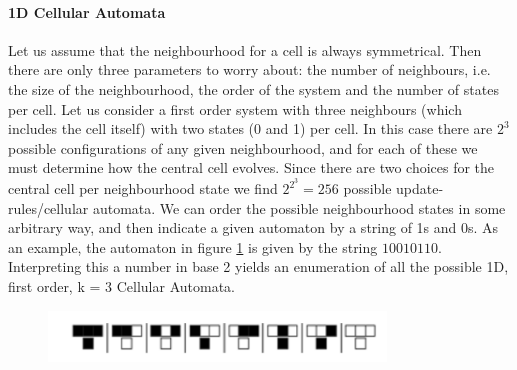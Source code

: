 \documentclass[12pt]{article}
\numberwithin{equation}{section}
\begin{document}
\paragraph{1D Cellular Automata}
Let us assume that the neighbourhood for a cell is always symmetrical. Then there are only three parameters to worry about: the number of neighbours, i.e. the size of the neighbourhood, the order of the system and the number of states per cell. Let us consider a first order system with three neighbours (which includes the cell itself) with two states (0 and 1) per cell. In this case there are \(2^3\) possible configurations of any given neighbourhood, and for each of these we must determine how the central cell evolves. Since there are two choices for the central cell per neighbourhood state we find \(2^{2^3} = 256\) possible update-rules/cellular automata. We can order the possible neighbourhood states in some arbitrary way, and then indicate a given automaton by a string of 1s and 0s. As an example, the automaton in figure \ref{RandomCA} is given by the string \(10010110\). Interpreting this a number in base 2 yields an enumeration of all the possible 1D, first order, k = 3 Cellular Automata. 

\begin{figure}[H]
\centering
\includegraphics[width=0.8\textwidth]{RandomCA.png}
\caption{}
\label{RandomCA}
\end{figure}
\end{document}
